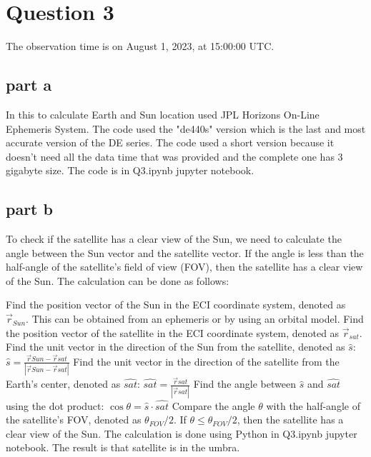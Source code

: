 \section{Question 3}
The observation time is on August 1, 2023, at 15:00:00 UTC.

\subsection{part a}
In this to calculate Earth and Sun location used JPL Horizons On-Line Ephemeris System. The code used the "de440s" version which is the last and most accurate version of the DE series. The code used a short version because it doesn't need all the data time that was provided and the complete one has 3 gigabyte size. The code is in Q3.ipynb jupyter notebook.

\subsection{part b}
To check if the satellite has a clear view of the Sun, we need to calculate the angle between the Sun vector and the satellite vector. If the angle is less than the half-angle of the satellite's field of view (FOV), then the satellite has a clear view of the Sun. The calculation can be done as follows:

Find the position vector of the Sun in the ECI coordinate system, denoted as $\vec{r}_{Sun}$. This can be obtained from an ephemeris or by using an orbital model.
Find the position vector of the satellite in the ECI coordinate system, denoted as $\vec{r}_{sat}$.
Find the unit vector in the direction of the Sun from the satellite, denoted as $\hat{s}$:
$\hat{s} = \frac{\vec{r}{Sun} - \vec{r}{sat}}{|\vec{r}{Sun} - \vec{r}{sat}|}$
Find the unit vector in the direction of the satellite from the Earth's center, denoted as $\hat{sat}$:
$\hat{sat} = \frac{\vec{r}{sat}}{|\vec{r}{sat}|}$
Find the angle between $\hat{s}$ and $\hat{sat}$ using the dot product:
$\cos{\theta} = \hat{s} \cdot \hat{sat}$
Compare the angle $\theta$ with the half-angle of the satellite's FOV, denoted as $\theta_{FOV}/2$. If $\theta \leq \theta_{FOV}/2$, then the satellite has a clear view of the Sun.
The calculation is done using Python in Q3.ipynb jupyter notebook. The result is that satellite is in the umbra.
